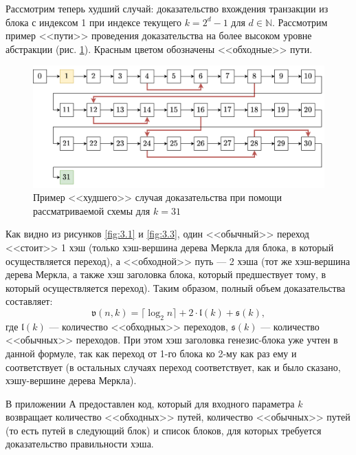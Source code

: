 \documentclass[12pt, a4paper]{extarticle}
\begin{document}
\begin{enumerate}
        Рассмотрим теперь худший случай: доказательство вхождения транзакции из блока с индексом 1
        при индексе текущего $k = 2 ^ d - 1$ для $d \in \mathbb{N}$. Рассмотрим пример <<пути>>
        проведения доказательства на более высоком уровне абстракции (рис. \ref{fig:3.3-2}). Красным
        цветом обозначены <<обходные>> пути.
        \begin{figure}[h!]
            \centering
            \includegraphics[width=\textwidth]{3.3-2.png}
            \caption{Пример <<худшего>> случая доказательства при помощи рассматриваемой схемы для $k = 31$}
            \label{fig:3.3-2}
        \end{figure}
        
        Как видно из рисунков \ref{fig:3.1} и \ref{fig:3.3}, один <<обычный>> переход <<стоит>> 1 хэш (только
        хэш-вершина дерева Меркла для блока, в который осуществляется переход), а <<обходной>> путь --- 2 хэша
        (тот же хэш-вершина дерева Меркла, а также хэш заголовка блока, который предшествует тому, в который
        осуществляется переход). Таким образом, полный объем доказательства составляет:
        \begin{equation}
            \mathfrak{v}(n, k) = \lceil \log_2 n \rceil + 2 \cdot \mathfrak{l}(k) + \mathfrak{s}(k),
        \end{equation}
        где $\mathfrak{l}(k)$ --- количество <<обходных>> переходов, $\mathfrak{s}(k)$ --- количество
        <<обычных>> переходов. При этом хэш заголовка генезис-блока уже учтен в данной формуле, так как
        переход от 1-го блока ко 2-му как раз ему и соответствует (в остальных случаях переход соответствует,
        как и было сказано, хэшу-вершине дерева Меркла).
        
        В приложении А предоставлен код, который для входного параметра $k$ возвращает количество 
        <<обходных>> путей, количество <<обычных>> путей (то есть путей в следующий блок) и список блоков, 
        для которых требуется доказательство правильности хэша.
        

\end{enumerate}
\end{document}
